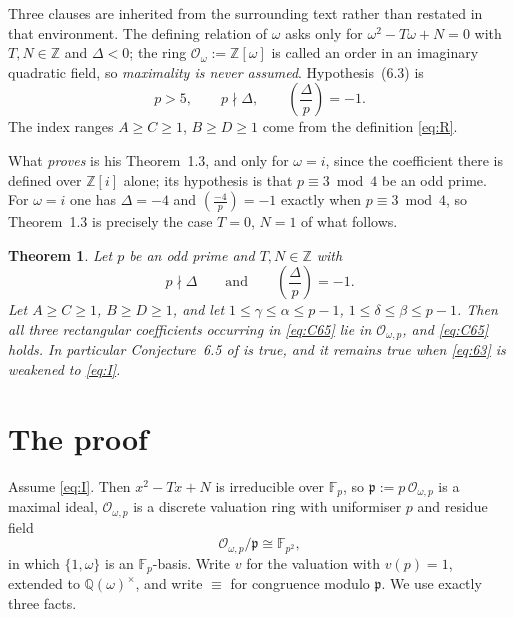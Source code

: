 \documentclass[11pt]{amsart}
\newtheorem{theorem}{Theorem}
\theoremstyle{remark}
\newcommand{\OO}{\mathcal{O}}
\newcommand{\Fp}{\mathbb{F}_p}
\newcommand{\ZZ}{\mathbb{Z}}
\newcommand{\QQ}{\mathbb{Q}}
\newcommand{\legendre}[2]{\left(\frac{#1}{#2}\right)}
\begin{document}
Three clauses are inherited from the surrounding text rather than restated
in that environment. The defining relation of $\omega$ asks only for
$\omega^{2}-T\omega+N=0$ with $T,N\in\ZZ$ and $\Delta<0$; the ring $\OO_{\omega}:=\ZZ[\omega]$ is called
an order in an imaginary quadratic field, so \emph{maximality is never
assumed}. Hypothesis~(6.3) is
\begin{equation}\label{eq:63}
 p>5,\qquad p\nmid\Delta,\qquad \legendre{\Delta}{p}=-1 .
\end{equation}
The index ranges $A\ge C\ge1$, $B\ge D\ge1$ come from the definition
\eqref{eq:R}.

What \cite{Calderon} \emph{proves} is his Theorem~1.3, and only for
$\omega=i$, since the coefficient there is defined over $\ZZ[i]$ alone;
its hypothesis is that $p\equiv3\bmod4$ be an odd prime. For $\omega=i$
one has $\Delta=-4$ and $\legendre{-4}{p}=-1$ exactly when
$p\equiv3\bmod4$, so Theorem~1.3 is precisely the case $T=0$, $N=1$ of
what follows.

\begin{theorem}\label{thm:main}
Let $p$ be an odd prime and $T,N\in\ZZ$ with
\begin{equation}\label{eq:I}
 p\nmid\Delta
 \qquad\text{and}\qquad
 \legendre{\Delta}{p}=-1 .
\end{equation}
Let $A\ge C\ge1$, $B\ge D\ge1$, and let
$1\le\gamma\le\alpha\le p-1$, $1\le\delta\le\beta\le p-1$. Then all three
rectangular coefficients occurring in \eqref{eq:C65} lie in
$\OO_{\omega,p}$, and \eqref{eq:C65} holds.
In particular Conjecture~6.5 of \cite{Calderon} is true, and it remains
true when \eqref{eq:63} is weakened to \eqref{eq:I}.
\end{theorem}

\section{The proof}\label{sec:proof}

Assume \eqref{eq:I}. Then $x^{2}-Tx+N$ is irreducible over $\Fp$, so
$\mathfrak p:=p\,\OO_{\omega,p}$ is a maximal ideal, $\OO_{\omega,p}$ is a
discrete valuation ring with uniformiser $p$ and residue field
\[
 \OO_{\omega,p}/\mathfrak p\cong\mathbb F_{p^{2}},
\]
in which $\{1,\omega\}$ is an $\Fp$-basis. Write $v$ for the valuation
with $v(p)=1$, extended to $\QQ(\omega)^{\times}$, and write $\equiv$ for
congruence modulo $\mathfrak p$. We use exactly three facts.
\end{document}
